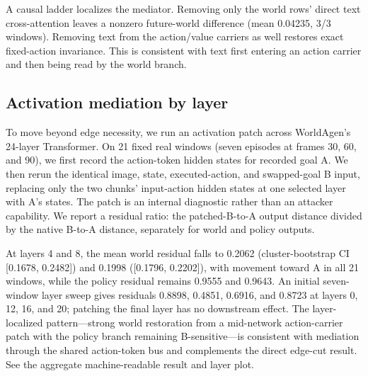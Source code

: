 \documentclass[10pt]{article}
\begin{document}
A causal ladder localizes the mediator. Removing only the world rows' direct text cross-attention leaves a nonzero future-world difference (mean 0.04235, 3/3 windows). Removing text from the action/value carriers as well restores exact fixed-action invariance. This is consistent with text first entering an action carrier and then being read by the world branch.

\subsection{Activation mediation by layer}
To move beyond edge necessity, we run an activation patch across WorldAgen's 24-layer Transformer. On 21 fixed real windows (seven episodes at frames 30, 60, and 90), we first record the action-token hidden states for recorded goal A. We then rerun the identical image, state, executed-action, and swapped-goal B input, replacing only the two chunks' input-action hidden states at one selected layer with A's states. The patch is an internal diagnostic rather than an attacker capability. We report a residual ratio: the patched-B-to-A output distance divided by the native B-to-A distance, separately for world and policy outputs.

At layers 4 and 8, the mean world residual falls to 0.2062 (cluster-bootstrap CI [0.1678, 0.2482]) and 0.1998 ([0.1796, 0.2202]), with movement toward A in all 21 windows, while the policy residual remains 0.9555 and 0.9643. An initial seven-window layer sweep gives residuals 0.8898, 0.4851, 0.6916, and 0.8723 at layers 0, 12, 16, and 20; patching the final layer has no downstream effect. The layer-localized pattern---strong world restoration from a mid-network action-carrier patch with the policy branch remaining B-sensitive---is consistent with mediation through the shared action-token bus and complements the direct edge-cut result. See the aggregate machine-readable result and layer plot.
\end{document}
